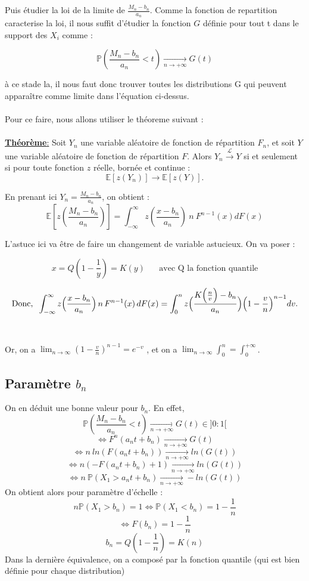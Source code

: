 \documentclass{article}
\begin{document}
Puis étudier la loi de la limite de $\frac{M_n - b_n}{a_n}$. Comme la fonction de repartition caracterise la loi, il nous suffit d'étudier la fonction $G$ définie pour tout t dans le support des $X_i$ comme :

\[
\mathbb{P} \left( \frac{M_n - b_n}{a_n} < t \right) \xrightarrow[n\to +\infty]{} G(t)
\]

à ce stade la, il nous faut donc trouver toutes les distributions G qui peuvent apparaître comme limite dans l’équation ci-dessus.
\\
\\
Pour ce faire, nous allons utiliser le théoreme suivant : 
\\
\\
\underline{\textbf{Théorème}:}
Soit \( Y_n \) une variable aléatoire de fonction de répartition \( F_n \), et soit \( Y \) une variable aléatoire de fonction de répartition \( F \).  
Alors $Y_n \xrightarrow{\mathcal{L} } Y$ si et seulement si pour toute fonction $z$ réelle, bornée et continue :
\[
\mathbb{E}[z(Y_n)] \to \mathbb{E}[z(Y)].
\]

En prenant ici $Y_n = \frac{M_n -b_n}{a_n}$, on obtient :
\[
\mathbb{E}[z(\frac{M_n -b_n}{a_n})] = \int_{-\infty}^{\infty} z(\frac{x-b_n}{a_n}) \: n \:  F^{n-1} (x)dF(x)
\]

L'astuce ici va être de faire un changement de variable astucieux. On va poser : 

\[
x = Q(1-\frac{1}{y}) = K(y) \; \; \; \; \; \; \text{avec Q la fonction quantile}
\]

\begin{equation}\label{eq:1.1}
    \text{Donc,} \; \; \int_{-\infty}^{\infty} z\Bigl(\frac{x-b_n}{a_n}\Bigr) \, n \, F^{n-1}(x)\,dF(x)
    =\int_{0}^{n} z\Bigl(\frac{K\Bigl(\frac{n}{v}\Bigr)-b_n}{a_n}\Bigr)
    \Bigl(1-\frac{v}{n}\Bigr)^{n-1}dv.
    \end{equation}
\\
\\
Or, on a $\lim_{n \to \infty} ( 1 - \frac{v}{n})^{n-1} = e^{-v}$ , et on a $\lim_{n \to \infty} \int_{0}^{n} = \int_{0}^{+ \infty}$.

\subsection{Paramètre $b_n$}

On en déduit une bonne valeur pour $b_n$. En effet,
\[
\mathbb{P} \left( \frac{M_n - b_n}{a_n} < t \right) \xrightarrow[n\to +\infty]{} G(t) \in ]0:1[
\]
\[
\Longleftrightarrow F^n(a_n t + b_n) \xrightarrow[n\to +\infty]{} G(t)
\]
\[
\Longleftrightarrow n \: ln(F(a_n t + b_n)) \xrightarrow[n\to +\infty]{} ln(G(t))
\]
\[
\Longleftrightarrow n(- F(a_n t + b_n) + 1) \xrightarrow[n\to +\infty]{} ln(G(t))
\]
\[
\Longleftrightarrow n \: \mathbb{P}(X_1 > a_n t + b_n ) \xrightarrow[n\to +\infty]{} - ln(G(t))
\]
On obtient alors pour paramètre d'échelle :
\[
n \mathbb{P}(X_1 > b_n) =1  \Longleftrightarrow \mathbb{P}(X_1 < b_n) = 1 - \frac{1}{n}
\]
\[
\Longleftrightarrow F(b_n) = 1 - \frac{1}{n}
\]
\[
b_n = Q(1-\frac{1}{n}) = K(n)
\]
Dans la dernière équivalence, on a composé par la fonction quantile (qui est bien définie pour chaque distribution)
\\
\end{document}
